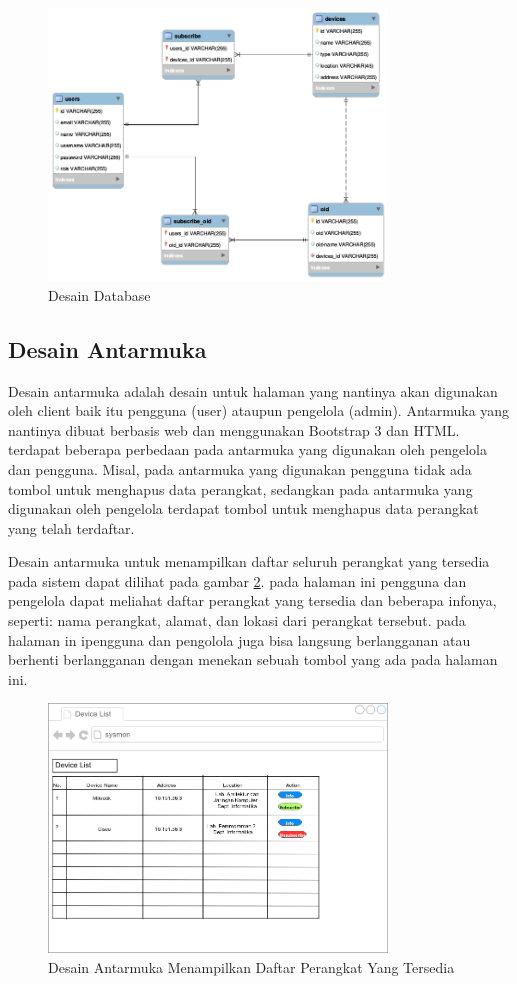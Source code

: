         	\begin{figure}[H]
        		\centering
        		\includegraphics[width=9cm]{Images/C-3/desaindb.png}
        		\caption{Desain Database}
        		\label{desain:desaindatabase}
        	\end{figure}
        	
		\subsection{Desain Antarmuka}
			Desain antarmuka adalah desain untuk halaman yang nantinya akan digunakan oleh client baik itu pengguna (user) ataupun pengelola (admin). Antarmuka yang nantinya dibuat berbasis web dan  menggunakan Bootstrap 3 dan HTML. terdapat beberapa perbedaan pada antarmuka yang digunakan oleh pengelola dan pengguna. Misal, pada antarmuka yang digunakan pengguna tidak ada tombol untuk menghapus data perangkat, sedangkan pada antarmuka yang digunakan oleh pengelola terdapat tombol untuk menghapus data perangkat yang telah terdaftar.
			
			Desain antarmuka untuk menampilkan daftar seluruh perangkat yang tersedia pada sistem dapat dilihat pada gambar \ref{desain:antarmuka1}. pada halaman ini pengguna dan pengelola dapat meliahat daftar perangkat yang tersedia dan beberapa infonya, seperti: nama perangkat, alamat, dan lokasi dari perangkat tersebut. pada halaman in ipengguna dan pengolola juga bisa langsung berlangganan atau berhenti berlangganan dengan menekan sebuah tombol yang ada pada halaman ini.
        	\begin{figure}[H]
        		\centering
        		\includegraphics[width=9cm]{Images/C-3/antarmuka1.png}
        		\caption{Desain Antarmuka Menampilkan Daftar Perangkat Yang Tersedia}
        		\label{desain:antarmuka1}
        	\end{figure}
        
